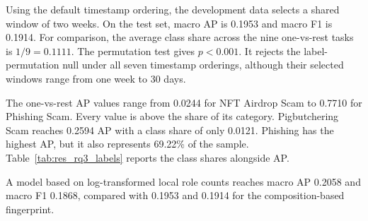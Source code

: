 Using the default timestamp ordering, the development data selects a shared
window of two weeks. On the test set, macro AP is 0.1953 and macro F1 is 0.1914.
For comparison, the average class share across the nine one-vs-rest tasks is
$1/9=0.1111$. The permutation test gives $p<0.001$. It rejects the
label-permutation null
under all seven timestamp orderings, although their selected windows range from
one week to 30 days.

The one-vs-rest AP values range from 0.0244 for NFT Airdrop Scam to 0.7710 for
Phishing Scam. Every value is above the share of its category. Pigbutchering Scam reaches
0.2594 AP with a class share of only 0.0121. Phishing has the highest AP, but it
also represents 69.22\% of the sample. Table~\ref{tab:res_rq3_labels} reports
the class shares alongside AP.

A model based on log-transformed local role counts reaches macro AP 0.2058 and macro F1 0.1868,
compared with 0.1953 and 0.1914 for the composition-based fingerprint.

